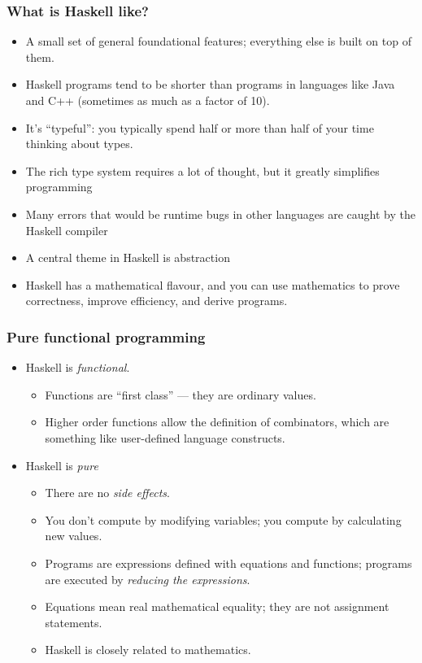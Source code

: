 \documentclass{beamer}
\begin{document}
\begin{frame}
\frametitle{What is Haskell like?}

\begin{itemize}
\item A small set of general foundational features; everything
  else is built on top of them.
\item Haskell programs tend to be shorter than programs in
  languages like Java and C++ (sometimes as much as a factor of
  10).
\item It's ``typeful'': you typically spend half or more than half
  of your time thinking about types.
\item The rich type system requires a lot of thought, but it
  greatly simplifies programming
\item Many errors that would be runtime bugs in other languages are
  caught by the Haskell compiler
\item A central theme in Haskell is abstraction
\item Haskell has a mathematical flavour, and you can use
  mathematics to prove correctness, improve efficiency, and derive
  programs.
\end{itemize}

\end{frame}

\begin{frame}
\frametitle{Pure functional programming}

\begin{itemize}
\item Haskell is \emph{functional}.
  \begin{itemize}
  \item Functions are ``first class'' --- they are ordinary values.
  \item Higher order functions allow the definition of combinators,
    which are something like user-defined language constructs.
  \end{itemize}
\item Haskell is \emph{pure}
  \begin{itemize}
  \item There are no \emph{side effects}.
  \item You don't compute by modifying variables; you compute by
    calculating new values.
  \item Programs are expressions defined with equations and
    functions; programs are executed by \emph{reducing the
      expressions}.
  \item Equations mean real mathematical equality; they are not
    assignment statements.
  \item Haskell is closely related to mathematics.
  \end{itemize}
\end{itemize}

\end{frame}
\end{document}
